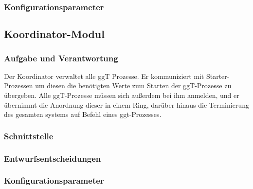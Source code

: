 \documentclass{article}
\begin{document}
\subsubsection{Konfigurationsparameter}

\newpage

\subsection{Koordinator-Modul}
\subsubsection{Aufgabe und Verantwortung}

Der Koordinator verwaltet alle ggT Prozesse. Er kommuniziert mit Starter-Prozessen um diesen die benötigten
Werte zum Starten der ggT-Prozesse zu übergeben. Alle ggT-Prozesse müssen sich außerdem bei ihm anmelden,
und er übernimmt die Anordnung dieser in einem Ring, darüber hinaus die Terminierung des gesamten systems auf Befehl eines
ggt-Prozesses.


\subsubsection{Schnittstelle}

\subsubsection{Entwurfsentscheidungen}

\subsubsection{Konfigurationsparameter}
\end{document}
